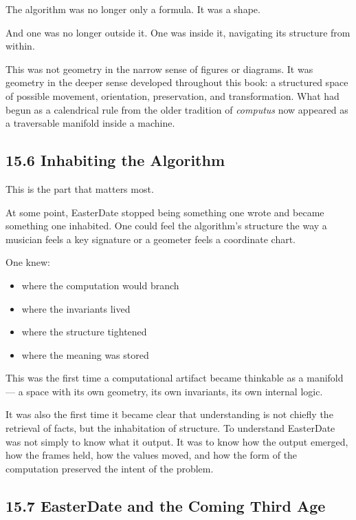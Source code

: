 \documentclass[
]{article}
\providecommand{\tightlist}{%
  \setlength{\itemsep}{0pt}\setlength{\parskip}{0pt}}
\begin{document}
The algorithm was no longer only a formula. It was a shape.

And one was no longer outside it. One was inside it, navigating its
structure from within.

This was not geometry in the narrow sense of figures or diagrams. It was
geometry in the deeper sense developed throughout this book: a
structured space of possible movement, orientation, preservation, and
transformation. What had begun as a calendrical rule from the older
tradition of \emph{computus} now appeared as a traversable manifold
inside a machine.

\hypertarget{inhabiting-the-algorithm}{%
\subsection{15.6 Inhabiting the
Algorithm}\label{inhabiting-the-algorithm}}

This is the part that matters most.

At some point, EasterDate stopped being something one wrote and became
something one inhabited. One could feel the algorithm's structure the
way a musician feels a key signature or a geometer feels a coordinate
chart.

One knew:

\begin{itemize}
\tightlist
\item
  where the computation would branch
\item
  where the invariants lived
\item
  where the structure tightened
\item
  where the meaning was stored
\end{itemize}

This was the first time a computational artifact became thinkable as a
manifold --- a space with its own geometry, its own invariants, its own
internal logic.

It was also the first time it became clear that understanding is not
chiefly the retrieval of facts, but the inhabitation of structure. To
understand EasterDate was not simply to know what it output. It was to
know how the output emerged, how the frames held, how the values moved,
and how the form of the computation preserved the intent of the problem.

\hypertarget{easterdate-and-the-coming-third-age}{%
\subsection{15.7 EasterDate and the Coming Third
Age}\label{easterdate-and-the-coming-third-age}}
\end{document}
